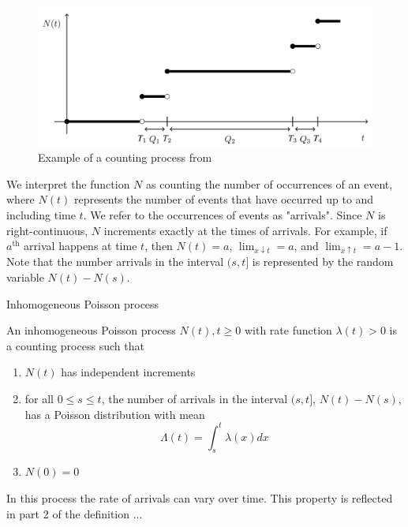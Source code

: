 \begin{figure}[h]
	\centering
	\includegraphics[width=\textwidth]{./figures/poisson_process_example.png}
	\caption{Example of a counting process from \cite{countingProcessFigure}}
	\label{fig:poissonProcessExample}
\end{figure}


We interpret the function $N$ as counting the number of occurrences of an event, where $N(t)$ represents the number of events that have occurred up to and including time $t$. We refer to the occurrences of events as "arrivals".  Since $N$ is right-continuous, $N$ increments exactly at the times of arrivals. For example, if $a^\text{th}$ arrival happens at time $t$, then $N(t) = a$, $\lim_{x \downarrow t} = a$, and $\lim_{x \uparrow t} = a - 1$. Note that the number arrivals in the interval $(s, t]$ is represented by the random variable $N(t) - N(s)$. 

\begin{definition}
	Inhomogeneous Poisson process

	\noindent
	An inhomogeneous Poisson process ${N(t), t \geq 0}$ with rate function $\lambda(t) > 0$ is a counting process such that
	\begin{enumerate}
		\item $N(t)$ has independent increments %
		\item for all $0 \leq s \leq t$, 
		the number of arrivals in the interval $(s, t]$,  %
		$N(t) - N(s)$, has a Poisson distribution with mean
		$$
			\Lambda(t) = \int_s^t \lambda(x) dx
		$$
		\item $N(0) = 0$
	\end{enumerate}
\end{definition}

In this process the rate of arrivals can vary over time. This property is reflected in part 2 of the definition ... %

